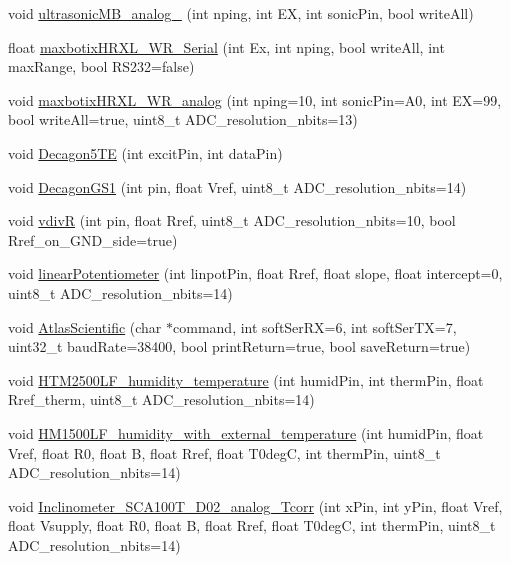 \begin{DoxyCompactItemize}
\item 
void \hyperlink{classLogger_a362a1462166d63ddc613eaa1e86f9854}{ultrasonic\+M\+B\+\_\+analog\+\_\+1cm} (int nping, int EX, int sonic\+Pin, bool write\+All)
\item 
float \hyperlink{classLogger_a87ce56cb9c3dfc7abfd6308b2ee7dc10}{maxbotix\+H\+R\+X\+L\+\_\+\+W\+R\+\_\+\+Serial} (int Ex, int nping, bool write\+All, int max\+Range, bool R\+S232=false)
\item 
void \hyperlink{classLogger_aa05378a90963ceebf7dad0904a74f42f}{maxbotix\+H\+R\+X\+L\+\_\+\+W\+R\+\_\+analog} (int nping=10, int sonic\+Pin=A0, int EX=99, bool write\+All=true, uint8\+\_\+t A\+D\+C\+\_\+resolution\+\_\+nbits=13)
\item 
void \hyperlink{classLogger_a40ae372dee7f672a6d6f33ab441e4da1}{Decagon5\+TE} (int excit\+Pin, int data\+Pin)
\item 
void \hyperlink{classLogger_a84da6a9ec3d4d56fdc32d950b71f1a26}{Decagon\+G\+S1} (int pin, float Vref, uint8\+\_\+t A\+D\+C\+\_\+resolution\+\_\+nbits=14)
\item 
void \hyperlink{classLogger_ab1ae31b2bdb77c86fb6851907258171b}{vdivR} (int pin, float Rref, uint8\+\_\+t A\+D\+C\+\_\+resolution\+\_\+nbits=10, bool Rref\+\_\+on\+\_\+\+G\+N\+D\+\_\+side=true)
\item 
void \hyperlink{classLogger_a12dc18b7b16c91de5f7a3af7edb381a9}{linear\+Potentiometer} (int linpot\+Pin, float Rref, float slope, float intercept=0, uint8\+\_\+t A\+D\+C\+\_\+resolution\+\_\+nbits=14)
\item 
void \hyperlink{classLogger_a9fdcbb56e3e4910ac895ee150fe1b9ed}{Atlas\+Scientific} (char $\ast$command, int soft\+Ser\+RX=6, int soft\+Ser\+TX=7, uint32\+\_\+t baud\+Rate=38400, bool print\+Return=true, bool save\+Return=true)
\item 
void \hyperlink{classLogger_a4ccff7a14a6bddc8bb28e22b3b36d3cc}{H\+T\+M2500\+L\+F\+\_\+humidity\+\_\+temperature} (int humid\+Pin, int therm\+Pin, float Rref\+\_\+therm, uint8\+\_\+t A\+D\+C\+\_\+resolution\+\_\+nbits=14)
\item 
void \hyperlink{classLogger_af0eda5a0be93a4d8505c7493d0f5e333}{H\+M1500\+L\+F\+\_\+humidity\+\_\+with\+\_\+external\+\_\+temperature} (int humid\+Pin, float Vref, float R0, float B, float Rref, float T0degC, int therm\+Pin, uint8\+\_\+t A\+D\+C\+\_\+resolution\+\_\+nbits=14)
\item 
void \hyperlink{classLogger_a91ffb193feceb75b2e19a3617d00455c}{Inclinometer\+\_\+\+S\+C\+A100\+T\+\_\+\+D02\+\_\+analog\+\_\+\+Tcorr} (int x\+Pin, int y\+Pin, float Vref, float Vsupply, float R0, float B, float Rref, float T0degC, int therm\+Pin, uint8\+\_\+t A\+D\+C\+\_\+resolution\+\_\+nbits=14)

\end{DoxyCompactItemize}

